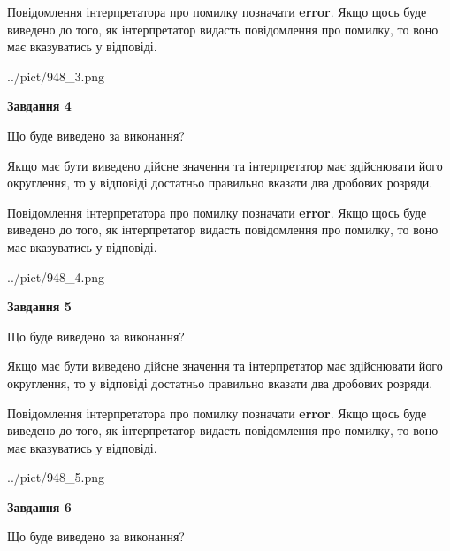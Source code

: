 \documentclass[12pt, ukrainian]{article}
\begin{document}
{\begin {Large}
Повідомлення інтерпретатора про помилку позначати \textbf{error}.
Якщо щось буде виведено до того, як інтерпретатор видасть повідомлення про помилку, 
то воно має вказуватись у відповіді. \par

\begin{center}
	{../pict/948_3.png}
\end{center}
\newpage

{\begin {center}\textbf{Завдання 4}\end {center}}\par
Що буде виведено за виконання? \par

Якщо має бути виведено дійсне значення та інтерпретатор має здійснювати його округлення, 
то у відповіді достатньо правильно вказати два дробових розряди.

Повідомлення інтерпретатора про помилку позначати \textbf{error}.
Якщо щось буде виведено до того, як інтерпретатор видасть повідомлення про помилку, 
то воно має вказуватись у відповіді. \par

\begin{center}
	{../pict/948_4.png}
\end{center}
\newpage

{\begin {center}\textbf{Завдання 5}\end {center}}\par
Що буде виведено за виконання? \par

Якщо має бути виведено дійсне значення та інтерпретатор має здійснювати його округлення, 
то у відповіді достатньо правильно вказати два дробових розряди.

Повідомлення інтерпретатора про помилку позначати \textbf{error}.
Якщо щось буде виведено до того, як інтерпретатор видасть повідомлення про помилку, 
то воно має вказуватись у відповіді. \par

\begin{center}
	{../pict/948_5.png}
\end{center}
\newpage

{\begin {center}\textbf{Завдання 6}\end {center}}\par
Що буде виведено за виконання? \par


\end{Large}}
\end{document}
